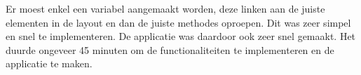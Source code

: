 Er moest enkel een variabel aangemaakt worden, deze linken aan de juiste elementen
in de layout en dan de juiste methodes oproepen. Dit was zeer simpel en snel te
implementeren. De applicatie was daardoor ook zeer snel gemaakt. Het duurde ongeveer 45 minuten 
om de functionaliteiten te implementeren en de applicatie te maken.


